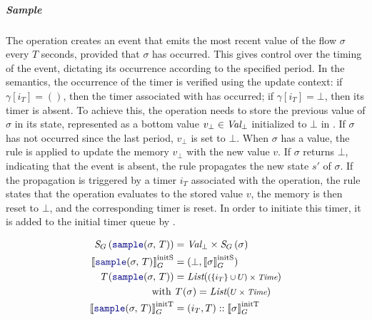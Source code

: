 \subparagraph{Sample}

The operation  creates an event that emits the most recent value of the flow
$\sigma$ every $T$ seconds, provided that $\sigma$ has occurred. This gives control over the
timing of the event, dictating its occurrence according to the specified period. In the semantics,
the occurrence of the timer is verified using the update context: if $\gamma[i_T] = ()$, then the
timer associated with  has occurred; if $\gamma[i_T] = \bot$, then its timer is
absent.
%
To achieve this, the operation needs to store the previous value of $\sigma$ in its state,
represented as a bottom value $v_\bot \in \textit{Val}_\bot$ initialized to $\bot$ in
.
%
If $\sigma$ has not occurred since the last period, $v_\bot$ is set to $\bot$. When $\sigma$ has a
value, the rule  is applied to update the memory $v_\bot$ with the
new value $v$. If $\sigma$ returns $\bot$, indicating that the event is absent, the rule
 propagates the new state $s'$ of $\sigma$. If the
propagation is triggered by a timer $i_T$ associated with the  operation, the rule
 states that the operation evaluates to the stored
value $v$, the memory is then reset to $\bot$, and the corresponding timer is reset.
%
In order to initiate this timer, it is added to the initial timer queue by
.

\begin{align}
    \stateTy{\sample{\sigma}{T}}   & = \ValBot \times \stateTy{\sigma} \label{eq:semantics:grfrp:opsem:stateTy:op:sample}      \\
    \initstate{\sample{\sigma}{T}} & = (\bot, \initstate{\sigma}) \label{eq:semantics:grfrp:opsem:init:op:sample:state}        \\
    \timerTy{\sample{\sigma}{T}}   & = \List{(\{i_T\} \cup U) \times \Time} \label{eq:semantics:grfrp:opsem:timerTy:op:sample} \\
    \text{with} \;                 & \timerTy{\sigma} = \List{U \times \Time} \nonumber                                        \\
    \inittimer{\sample{\sigma}{T}} & = (i_T, T) :: \inittimer{\sigma} \label{eq:semantics:grfrp:opsem:init:op:sample:timer}
\end{align}

